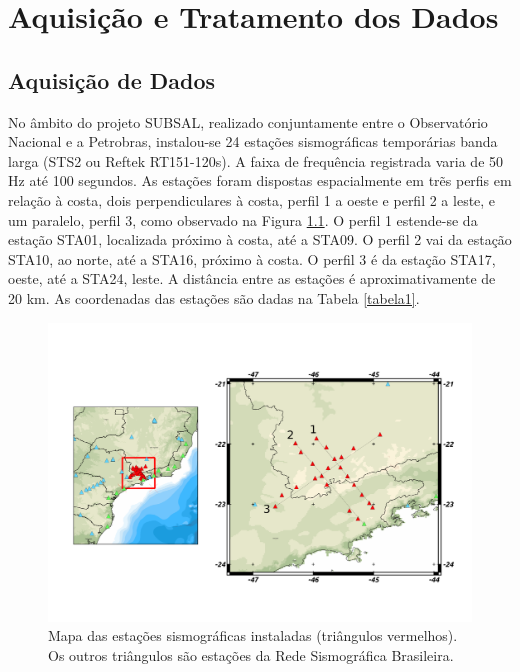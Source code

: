 \chapter{Aquisição e Tratamento dos Dados}	

\section{Aquisição de Dados}

No âmbito do projeto SUBSAL, realizado conjuntamente entre o Observatório Nacional e a Petrobras,  instalou-se 24 estações sismográficas temporárias banda larga (STS2 ou Reftek RT151-120s). A faixa de frequência registrada varia de 50 Hz até 100 segundos.  As estações foram dispostas espacialmente em trẽs perfis em relação à costa, dois perpendiculares à costa, perfil 1 a oeste e perfil 2 a leste, e um paralelo, perfil 3, como observado na Figura \ref{map_loc}. O perfil 1 estende-se da estação STA01, localizada próximo à costa, até a STA09. O perfil 2 vai da estação STA10, ao norte, até a STA16, próximo à costa. O perfil 3 é da estação STA17, oeste, até a STA24, leste. A distância entre as estações é aproximativamente de 20 km. As coordenadas das estações são dadas na Tabela \ref{tabela1}. 

\begin{figure}[!ht]
\centering
\includegraphics[scale=0.4]{mapa_das_estacoes_simosgraficas_instaladas.png}
\caption{Mapa das estações sismográficas instaladas (triângulos vermelhos). Os outros triângulos são estações da Rede Sismográfica Brasileira.}
\label{map_loc}
\end{figure}

